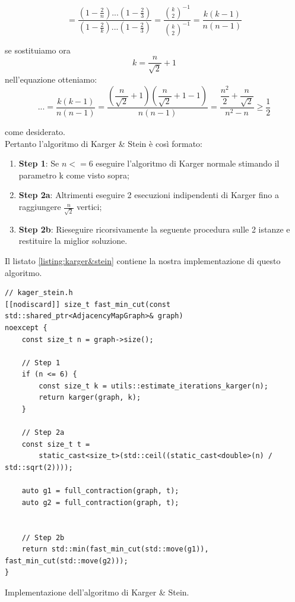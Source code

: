 $$ = \dfrac{(1 - \frac{2}{n}) ... (1 - \frac{2}{3})}{(1 - \frac{2}{k}) ... (1 - \frac{2}{3})} = \dfrac{{k\choose 2}^{-1}} {{k\choose 2}^{-1}} = \dfrac{k(k-1)}{n(n-1)}$$

\noindent se sostituiamo ora $$ k = \dfrac{n}{\sqrt{2}} + 1$$ nell'equazione otteniamo:
$$ ... = \dfrac{k(k-1)}{n(n-1)} = \dfrac{\left( \dfrac{n}{\sqrt{2}} + 1 \right) \left( \dfrac{n}{\sqrt{2}} + 1 - 1 \right) }{n(n-1)} =  \dfrac{\dfrac{n^2}{2} + \dfrac{n}{\sqrt{2}}}{n^2 - n}  \geq \dfrac{1}{2}$$

\noindent come desiderato.\\

\noindent Pertanto l'algoritmo di Karger \& Stein è così formato:
\begin{enumerate}
    \item \textbf{Step 1}: Se $n <= 6$ eseguire l'algoritmo di Karger normale stimando il parametro k come visto sopra;
    \item \textbf{Step 2a}: Altrimenti eseguire 2 esecuzioni indipendenti di Karger fino a raggiungere $\frac{n}{\sqrt{2}}$ vertici;
    \item \textbf{Step 2b}: Rieseguire ricorsivamente la seguente procedura sulle 2 istanze e restituire la miglior soluzione.
\end{enumerate}

Il listato \ref{listing:karger&stein} contiene la nostra implementazione di questo algoritmo.


\begin{listing}[!ht]
\begin{verbatim}
// kager_stein.h
[[nodiscard]] size_t fast_min_cut(const std::shared_ptr<AdjacencyMapGraph>& graph)
noexcept {
    const size_t n = graph->size();

    // Step 1
    if (n <= 6) {
        const size_t k = utils::estimate_iterations_karger(n);
        return karger(graph, k);
    }

    // Step 2a
    const size_t t =
        static_cast<size_t>(std::ceil((static_cast<double>(n) / std::sqrt(2))));

    auto g1 = full_contraction(graph, t);
    auto g2 = full_contraction(graph, t);


    // Step 2b
    return std::min(fast_min_cut(std::move(g1)), fast_min_cut(std::move(g2)));
}
\end{verbatim}
\caption{Implementazione dell'algoritmo di Karger \& Stein.}
\label{listing:karger&stein}
\end{listing}


